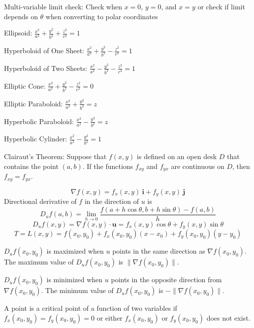 \documentclass[10pt,twocolumn]{extarticle}
\begin{document}
Multi-variable limit check: Check when $x=0$, $y=0$, and $x=y$ or check if limit depends on $\theta$ when converting to polar coordinates
\vspace{1em}

Ellipsoid: $\frac{x^2}{a^2} + \frac{y^2}{b^2} + \frac{z^2}{c^2} = 1$
\vspace{1em}

Hyperboloid of One Sheet: $\frac{x^2}{a^2} + \frac{y^2}{b^2} - \frac{z^2}{c^2} = 1$
\vspace{1em}

Hyperboloid of Two Sheets: $\frac{x^2}{a^2} - \frac{y^2}{b^2} - \frac{z^2}{c^2} = 1$
\vspace{1em}

Elliptic Cone: $\frac{x^2}{a^2} + \frac{y^2}{b^2} - \frac{z^2}{c^2} = 0$
\vspace{1em}

Elliptic Paraboloid: $\frac{x^2}{a^2} + \frac{y^2}{b^2} = z$
\vspace{1em}

Hyperbolic Paraboloid: $\frac{x^2}{a^2} - \frac{y^2}{b^2} = z$
\vspace{1em}

Hyperbolic Cylinder: $\frac{x^2}{a^2} - \frac{y^2}{b^2} = 1$
\vspace{1em}

Clairaut's Theorem: Suppose that $f(x, y)$ is defined on an open desk $D$ that contains the point $(a, b)$. If the functions $f_{xy}$ and $f_{yx}$ are continuous on $D$, then $f_{xy}=f_{yx}$.

\[\nabla f(x,y)=f_x(x,y)\:\mathbf{i}+f_y(x,y)\:\mathbf{j}\]
Directional derivative of $f$ in the direction of $u$ is
\[D_u f(a, b)=\lim_{h\rightarrow 0}\frac{f(a+h\cos\theta, b+h\sin\theta)-f(a,b)}{h}\]
\[D_u f(x, y) = \nabla f(x,y)\cdot\mathbf{u} = f_x(x, y)\cos\theta + f_y(x,y)\sin\theta\]
\[T=L(x,y)=f(x_0,y_0)+f_x(x_0,y_0)(x-x_0)+f_y(x_0,y_0)(y-y_0)\]

$D_u f(x_0, y_0)$ is maximized when $u$ points in the same direction as $\nabla f(x_0, y_0)$. The maximum value of $D_u f(x_0, y_0)$ is $\|\nabla f(x_0, y_0)\|$.
\vspace{0em}

$D_u f(x_0, y_0)$ is minimized when $u$ points in the opposite direction from $\nabla f(x_0, y_0)$. The minimum value of $D_u f(x_0, y_0)$ is $-\|\nabla f(x_0, y_0)\|$.
\vspace{1em}

A point is a critical point of a function of two variables if $f_x(x_0,y_0)=f_y(x_0,y_0)=0$ or either $f_x(x_0,y_0)$ or $f_y(x_0,y_0)$ does not exist.
\vspace{1em}
\end{document}
